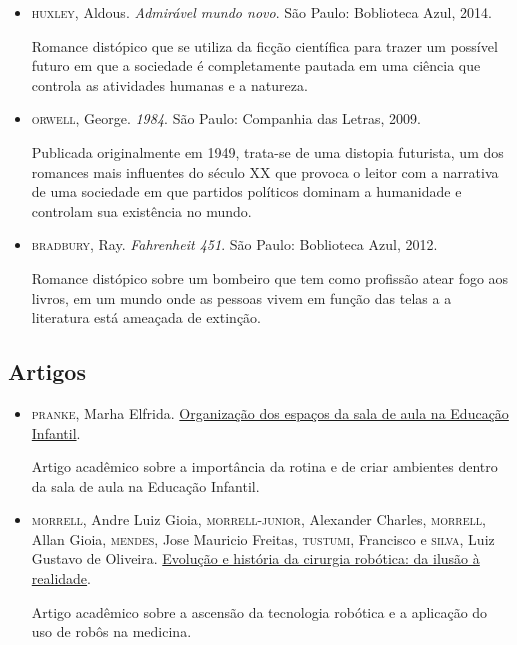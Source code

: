 \documentclass[11pt]{extarticle}
\begin{document}
\begin{itemize}
\item \textsc{huxley}, Aldous. \textit{Admirável mundo novo}. São Paulo: Boblioteca Azul, 2014.

Romance distópico que se utiliza da ficção científica para trazer um possível futuro em que a sociedade é completamente pautada em uma ciência que controla as atividades humanas e a natureza.  

\item \textsc{orwell}, George. \textit{1984}. São Paulo: Companhia das Letras, 2009.

Publicada originalmente em 1949, trata-se de uma distopia futurista, um dos romances mais influentes do século XX que provoca o leitor com a narrativa de uma sociedade em que partidos políticos dominam a humanidade e controlam sua existência no mundo.

\item \textsc{bradbury}, Ray. \textit{Fahrenheit 451}. São Paulo: Boblioteca Azul, 2012.

Romance distópico sobre um bombeiro que tem como profissão atear fogo aos livros, em um mundo onde as pessoas vivem em função das telas a a literatura está ameaçada de extinção.

\end{itemize}

\subsection{Artigos}

\begin{itemize}
\item \textsc{pranke}, Marha Elfrida. \href{http://centraldeinteligenciaacademica.blogspot.com/2016/04/organizacao-dos-espacos-da-sala-de-aula.html}{Organização dos espaços da sala de aula na Educação Infantil}. 

Artigo acadêmico sobre a importância da rotina e de criar ambientes dentro da sala de aula na Educação Infantil.

\item \textsc{morrell}, Andre Luiz Gioia, \textsc{morrell-junior}, Alexander Charles, \textsc{morrell}, Allan Gioia, \textsc{mendes}, Jose Mauricio Freitas, \textsc{tustumi}, Francisco e \textsc{silva}, Luiz Gustavo de Oliveira. \href{https://www.scielo.br/j/rcbc/a/4qVcw3NC75jwPNtkgkhwSWf/?lang=pt}{Evolução e história da cirurgia robótica: da ilusão à realidade}. 

Artigo acadêmico sobre a ascensão da tecnologia robótica e a aplicação do uso de robôs na medicina. 
\end{itemize}
\end{document}
